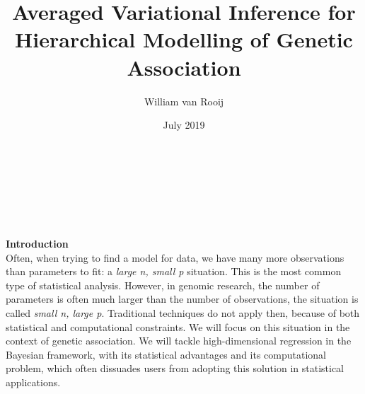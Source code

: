 \documentclass[final]{beamer}
\author{William van Rooij}
\title{Averaged Variational Inference for Hierarchical Modelling of Genetic Association}
\date{July 2019}
\institute{École Polytechnique Fédérale de Lausanne}
\begin{document}
\begin{center}
{\huge \inserttitle}\\
{\large\insertauthor}\\
\textsc{\insertinstitute}\\
\textit{\insertdate}\\
\end{center}
\vspace{1em}
\begin{multicols*}{3}
\textbf{\large Introduction}\\

\vspace{1em}
Often, when trying to find a model for data, we have many more observations than parameters to fit: a \textit{large n, small p} situation. This is the most common type of statistical analysis. However, in genomic research, the number of parameters is often much larger than the number of observations,  the situation is called \textit{small n, large p}. Traditional techniques do not apply then, because of both statistical and computational constraints. We will focus on this situation in the context of genetic association. We will tackle high-dimensional regression in the Bayesian framework, with its statistical advantages and its computational problem, which often dissuades users from adopting this solution in statistical applications.


\end{multicols*}
\end{document}
